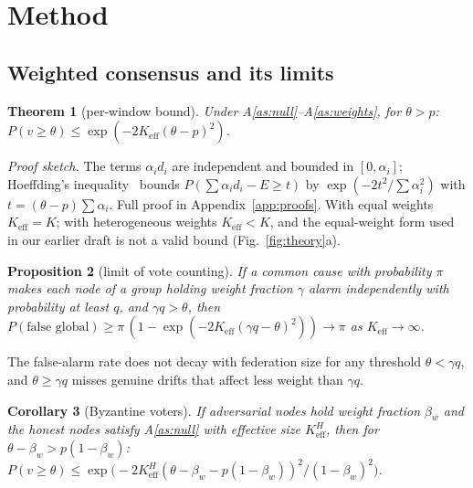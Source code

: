 \IfFileExists{IEEEtran.cls}{\documentclass[journal]{IEEEtran}\newcommand{\ieeemode}{}}{\documentclass[10pt,twocolumn,letterpaper]{article}\usepackage[margin=0.72in,columnsep=0.22in]{geometry}}
\newtheorem{theorem}{Theorem}
\newtheorem{proposition}[theorem]{Proposition}
\newtheorem{corollary}[theorem]{Corollary}
\newcommand{\Keff}{K_{\mathrm{eff}}}
\begin{document}
\section{Method}\label{sec:method}
\subsection{Weighted consensus and its limits}
\begin{theorem}[per-window bound]\label{thm:keff}
Under A\ref{as:null}--A\ref{as:weights}, for $\theta>p$: $P(v\ge\theta)\le\exp(-2\Keff(\theta-p)^2)$.
\end{theorem}
\noindent\emph{Proof sketch.} The terms $\alpha_id_i$ are independent and bounded in $[0,\alpha_i]$; Hoeffding's inequality~\cite{hoeffding1963} bounds $P(\sum\alpha_id_i-E\ge t)$ by $\exp(-2t^2/\sum\alpha_i^2)$ with $t=(\theta-p)\sum\alpha_i$. Full proof in Appendix~\ref{app:proofs}. With equal weights $\Keff=K$; with heterogeneous weights $\Keff<K$, and the equal-weight form used in our earlier draft is not a valid bound (Fig.~\ref{fig:theory}a).
\begin{proposition}[limit of vote counting]\label{prop:limit}
If a common cause with probability $\pi$ makes each node of a group holding weight fraction $\gamma$ alarm independently with probability at least $q$, and $\gamma q>\theta$, then $P(\text{false global})\ge\pi\,(1-\exp(-2\Keff(\gamma q-\theta)^2))\to\pi$ as $\Keff\to\infty$.
\end{proposition}
\noindent The false-alarm rate does not decay with federation size for any threshold $\theta<\gamma q$, and $\theta\ge\gamma q$ misses genuine drifts that affect less weight than $\gamma q$.

\begin{corollary}[Byzantine voters]\label{cor:byz}
If adversarial nodes hold weight fraction $\beta_w$ and the honest nodes satisfy A\ref{as:null} with effective size $\Keff^{H}$, then for $\theta-\beta_w>p(1-\beta_w)$: $P(v\ge\theta)\le\exp\!\big(-2\Keff^{H}(\theta-\beta_w-p(1-\beta_w))^2/(1-\beta_w)^2\big)$.
\end{corollary}
\end{document}
